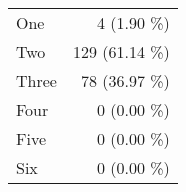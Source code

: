 \begin{tabular}{ l  r }
One & 4 (1.90 \%)\\
Two & 129 (61.14 \%)\\
Three & 78 (36.97 \%)\\
Four & 0 (0.00 \%)\\
Five & 0 (0.00 \%)\\
Six & 0 (0.00 \%)\\
\end{tabular}